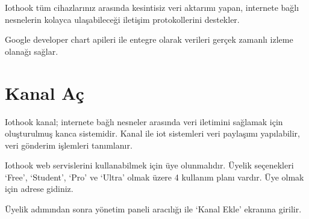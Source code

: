 \documentclass[letterpaper,10pt,turkish]{sphinxmanual}
\begin{document}
Iothook tüm cihazlarınız arasında kesintisiz veri aktarımı yapan, internete bağlı nesnelerin
kolayca ulaşabileceği iletişim protokollerini destekler.

Google developer chart apileri ile entegre olarak verileri gerçek zamanlı izleme olanağı sağlar.


\section{Kanal Aç}
\label{\detokenize{create-new-channel::doc}}\label{\detokenize{create-new-channel:create-new-channel}}\label{\detokenize{create-new-channel:kanal-ac}}
Iothook kanal; internete bağlı nesneler arasında veri iletimini sağlamak için oluşturulmuş
kanca sistemidir. Kanal ile iot sistemleri veri paylaşımı yapılabilir, veri gönderim işlemleri tanımlanır.

Iothook web servislerini kullanabilmek için üye olunmalıdır. Üyelik
seçenekleri ‘Free’, ‘Student’, ‘Pro’ ve ‘Ultra’ olmak üzere 4
kullanım planı vardır. Üye olmak için adrese gidiniz.

Üyelik adımından sonra yönetim paneli aracılığı ile ‘Kanal Ekle’ ekranına girilir.
\end{document}
